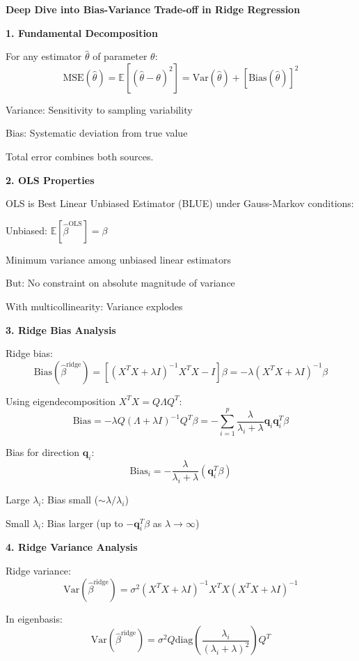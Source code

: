 \documentclass[12pt]{article}
\begin{document}
\begin{explanation}

\textbf{Deep Dive into Bias-Variance Trade-off in Ridge Regression}

\textbf{1. Fundamental Decomposition}

For any estimator $\hat{\theta}$ of parameter $\theta$:
\[\text{MSE}(\hat{\theta}) = \mathbb{E}[(\hat{\theta} - \theta)^2] = \text{Var}(\hat{\theta}) + [\text{Bias}(\hat{\theta})]^2\]

Variance: Sensitivity to sampling variability

Bias: Systematic deviation from true value

Total error combines both sources.

\textbf{2. OLS Properties}

OLS is Best Linear Unbiased Estimator (BLUE) under Gauss-Markov conditions:

Unbiased: $\mathbb{E}[\hat{\beta}^{\text{OLS}}] = \beta$

Minimum variance among unbiased linear estimators

But: No constraint on absolute magnitude of variance

With multicollinearity: Variance explodes

\textbf{3. Ridge Bias Analysis}

Ridge bias:
\[\text{Bias}(\hat{\beta}^{\text{ridge}}) = [(X^TX + \lambda I)^{-1}X^TX - I]\beta = -\lambda(X^TX + \lambda I)^{-1}\beta\]

Using eigendecomposition $X^TX = Q\Lambda Q^T$:
\[\text{Bias} = -\lambda Q(\Lambda + \lambda I)^{-1}Q^T\beta = -\sum_{i=1}^{p} \frac{\lambda}{\lambda_i + \lambda} \mathbf{q}_i \mathbf{q}_i^T \beta\]

Bias for direction $\mathbf{q}_i$:
\[\text{Bias}_i = -\frac{\lambda}{\lambda_i + \lambda}(\mathbf{q}_i^T\beta)\]

Large $\lambda_i$: Bias small ($\sim \lambda/\lambda_i$)

Small $\lambda_i$: Bias larger (up to $-\mathbf{q}_i^T\beta$ as $\lambda \to \infty$)

\textbf{4. Ridge Variance Analysis}

Ridge variance:
\[\text{Var}(\hat{\beta}^{\text{ridge}}) = \sigma^2(X^TX + \lambda I)^{-1}X^TX(X^TX + \lambda I)^{-1}\]

In eigenbasis:
\[\text{Var}(\hat{\beta}^{\text{ridge}}) = \sigma^2 Q \text{diag}\left(\frac{\lambda_i}{(\lambda_i + \lambda)^2}\right) Q^T\]


\end{explanation}
\end{document}
